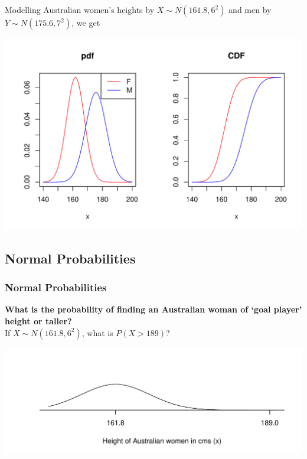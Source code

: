 \documentclass[t,xcolor=pdftex,dvipsnames,table]{beamer}
\makeatletter
\def\maxwidth{ %
  \ifdim\Gin@nat@width>\linewidth
    \linewidth
  \else
    \Gin@nat@width
  \fi
}
\newenvironment{knitrout}{}{} %
\makeatother
\begin{document}
\begin{frame}[fragile]

Modelling Australian women's heights by $X \sim N(161.8,6^2)$ and men by $Y \sim N(175.6,7^2)$, we get \\
\href{http://www.abs.gov.au/ausstats/abs@.nsf/0/E11CED5FB86D178ACA257AA30014C059?opendocument
}{}


\begin{knitrout}
\color{fgcolor}
\includegraphics[width=\maxwidth]{figure/unnamed-chunk-7-1} 

\end{knitrout}
\end{frame}


\subsection[Normal Probabilities]{Normal Probabilities}

\begin{frame}[fragile]\frametitle{Normal Probabilities}

{\bf What is the probability of finding an Australian woman of `goal player' height or taller?} \\

\vspace{.5cm}
If $X \sim N(161.8,6^2)$, what is $P(X > 189)$?


\vspace{1cm}
\begin{knitrout}
\color{fgcolor}
\includegraphics[width=\maxwidth]{figure/unnamed-chunk-8-1} 

\end{knitrout}
\end{frame}
\end{document}
